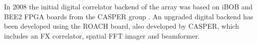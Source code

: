 \documentclass[useAMS,macros,usenatbib]{mn2e}
\begin{document}
In 2008 the initial digital correlator backend of the array was based on iBOB and BEE2 FPGA boards from the CASPER group \citep{best2-casper}.
An upgraded digital backend has been developed using the ROACH board, also developed by CASPER, which includes an FX correlator, spatial FFT imager and beamformer.
\end{document}
